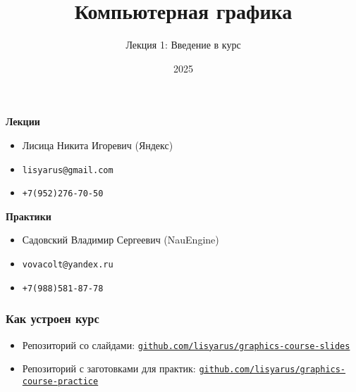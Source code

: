 \documentclass[10pt]{beamer}
\title{Компьютерная графика}
\subtitle{Лекция 1: Введение в курс}
\date{2025}
\begin{document}
\frame{\titlepage}

\begin{frame}
\frametitle{}
\textbf{Лекции}
\begin{itemize}
\item Лисица Никита Игоревич (Яндекс)
\item \nolinkurl{lisyarus@gmail.com}
\item \nolinkurl{+7(952)276-70-50}
\end{itemize}
\textbf{Практики}
\begin{itemize}
\item Садовский Владимир Сергеевич (NauEngine)
\item \nolinkurl{vovacolt@yandex.ru}
\item \nolinkurl{+7(988)581-87-78}
\end{itemize}
\end{frame}

\begin{frame}
\frametitle{Как устроен курс}
\begin{itemize}
\item Репозиторий со слайдами: \href{https://github.com/lisyarus/graphics-course-slides/tree/master/pdf}{\nolinkurl{github.com/lisyarus/graphics-course-slides}}
\item Репозиторий с заготовками для практик: \href{https://github.com/lisyarus/graphics-course-practice}{\nolinkurl{github.com/lisyarus/graphics-course-practice}}
\end{itemize}
\end{frame}
\end{document}
